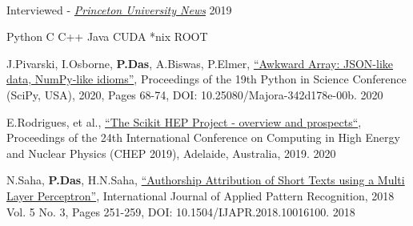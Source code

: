 \documentclass[10pt, letterpaper]{fulldeps}
\begin{document}
\vspace{-10pt}

%
%
\vspace{-5pt}
\\
\vspace{-15pt}
\begin{tightitemize}
\item Interviewed - \textit{\href{https://www.princeton.edu/news/2019/08/19/princeton-leads-efforts-develop-national-data-training-framework-high-energy}{Princeton University News}} \hfill{2019}
\end{tightitemize}
\vspace{-5pt}

%
%
\vspace{-3pt}
\textbullet{}Python \textbullet{}C \textbullet{}C++ \textbullet{}Java \textbullet{}CUDA \textbullet{}*nix \textbullet{}ROOT
\vspace{-4pt}

%
%
\small{\begin{tightitemize}
    \item J.Pivarski, I.Osborne, {\textbf{P.Das}}, A.Biswas, P.Elmer, {\href{http://conference.scipy.org/proceedings/scipy2020/jim_pivarski.html}{``Awkward Array: JSON-like data, NumPy-like idioms''}}, Proceedings of the 19th Python in Science Conference (SciPy, USA), 2020, Pages 68-74, DOI: 10.25080/Majora-342d178e-00b. \hfill{2020}
    \item E.Rodrigues, et al., {\href{https://arxiv.org/abs/2007.03577}{``The Scikit HEP Project - overview and prospects``}}, Proceedings of the 24th International Conference on Computing in High Energy and Nuclear Physics (CHEP 2019), Adelaide, Australia, 2019. \hfill{2020}
    \item N.Saha, {\textbf{P.Das}}, H.N.Saha, {\href{https://www.inderscienceonline.com/doi/abs/10.1504/IJAPR.2018.094819}{``Authorship Attribution of Short Texts using a Multi Layer Perceptron''}}, International Journal of Applied Pattern Recognition, 2018 Vol. 5 No. 3, Pages 251-259, DOI: 10.1504/IJAPR.2018.10016100. \hfill{2018}
\end{tightitemize}}
\end{document}
